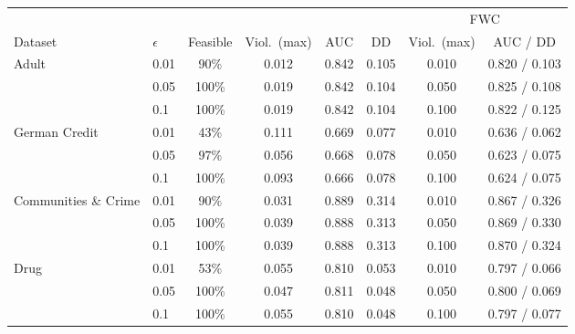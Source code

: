 \begin{tabular}{llcccccc}
\toprule
 & & \multicolumn{4}{c}{\method{}} & \multicolumn{2}{c}{FWC}\\
\cmidrule(lr){3-6}\cmidrule(lr){7-8}
Dataset & $\epsilon$ & Feasible & Viol.\ (max) & AUC & DD & Viol.\ (max) & AUC / DD\\
\midrule
Adult & 0.01 & 90\% & 0.012 & 0.842 & 0.105 & 0.010 & 0.820 / 0.103\\
 & 0.05 & 100\% & 0.019 & 0.842 & 0.104 & 0.050 & 0.825 / 0.108\\
 & 0.1 & 100\% & 0.019 & 0.842 & 0.104 & 0.100 & 0.822 / 0.125\\
\midrule
German Credit & 0.01 & 43\% & 0.111 & 0.669 & 0.077 & 0.010 & 0.636 / 0.062\\
 & 0.05 & 97\% & 0.056 & 0.668 & 0.078 & 0.050 & 0.623 / 0.075\\
 & 0.1 & 100\% & 0.093 & 0.666 & 0.078 & 0.100 & 0.624 / 0.075\\
\midrule
Communities \& Crime & 0.01 & 90\% & 0.031 & 0.889 & 0.314 & 0.010 & 0.867 / 0.326\\
 & 0.05 & 100\% & 0.039 & 0.888 & 0.313 & 0.050 & 0.869 / 0.330\\
 & 0.1 & 100\% & 0.039 & 0.888 & 0.313 & 0.100 & 0.870 / 0.324\\
\midrule
Drug & 0.01 & 53\% & 0.055 & 0.810 & 0.053 & 0.010 & 0.797 / 0.066\\
 & 0.05 & 100\% & 0.047 & 0.811 & 0.048 & 0.050 & 0.800 / 0.069\\
 & 0.1 & 100\% & 0.055 & 0.810 & 0.048 & 0.100 & 0.797 / 0.077\\
\bottomrule
\end{tabular}

